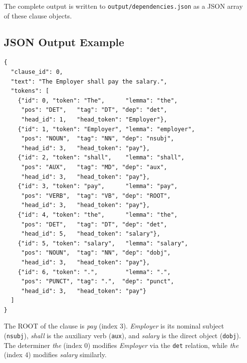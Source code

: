 \documentclass[assignment.tex]{subfiles}
\begin{document}
The complete output is written to \texttt{output/dependencies.json} as a JSON array
of these clause objects.

\subsection{JSON Output Example}

\begin{lstlisting}[style=jsonStyle,
                   caption={Dependency parse output for the clause
                   \textit{``The Employer shall pay the salary.''}},
                   label={lst:dep-json}]
{
  "clause_id": 0,
  "text": "The Employer shall pay the salary.",
  "tokens": [
    {"id": 0, "token": "The",      "lemma": "the",
     "pos": "DET",   "tag": "DT", "dep": "det",
     "head_id": 1,   "head_token": "Employer"},
    {"id": 1, "token": "Employer", "lemma": "employer",
     "pos": "NOUN",  "tag": "NN", "dep": "nsubj",
     "head_id": 3,   "head_token": "pay"},
    {"id": 2, "token": "shall",    "lemma": "shall",
     "pos": "AUX",   "tag": "MD", "dep": "aux",
     "head_id": 3,   "head_token": "pay"},
    {"id": 3, "token": "pay",      "lemma": "pay",
     "pos": "VERB",  "tag": "VB", "dep": "ROOT",
     "head_id": 3,   "head_token": "pay"},
    {"id": 4, "token": "the",      "lemma": "the",
     "pos": "DET",   "tag": "DT", "dep": "det",
     "head_id": 5,   "head_token": "salary"},
    {"id": 5, "token": "salary",   "lemma": "salary",
     "pos": "NOUN",  "tag": "NN", "dep": "dobj",
     "head_id": 3,   "head_token": "pay"},
    {"id": 6, "token": ".",        "lemma": ".",
     "pos": "PUNCT", "tag": ".",  "dep": "punct",
     "head_id": 3,   "head_token": "pay"}
  ]
}
\end{lstlisting}

The ROOT of the clause is \textit{pay} (index 3).  \textit{Employer} is its nominal
subject (\texttt{nsubj}), \textit{shall} is the auxiliary verb (\texttt{aux}), and
\textit{salary} is the direct object (\texttt{dobj}).  The determiner
\textit{the} (index 0) modifies \textit{Employer} via the \texttt{det} relation,
while \textit{the} (index 4) modifies \textit{salary} similarly.
\end{document}
